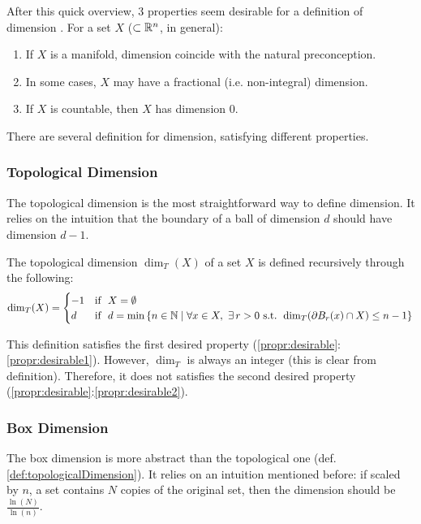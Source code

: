After this quick overview, 3 properties seem desirable for a definition of dimension \cite{Pollicott_LFDT}.
For a set $X$ ($\subset \mathbb{R}^n$, in general):
\begin{enumerate}\label{propr:desirable}
	\item If $X$ is a manifold, dimension coincide with the natural preconception. \label{propr:desirable1}
	\item In some cases, $X$ may have a fractional (i.e. non-integral) dimension. \label{propr:desirable2}
	\item If $X$ is countable, then $X$ has dimension $0$. \label{propr:desirable3}
\end{enumerate}
There are several definition for dimension, satisfying different properties.

\subsubsection{Topological Dimension}
The topological dimension is the most straightforward way to define dimension.
It relies on the intuition that the boundary of a ball of dimension $d$ should have dimension $d-1$.

\begin{definition}\label{def:topologicalDimension}
	The topological dimension $\dim_T(X)$ of a set $X$ is defined recursively through the following:
	\begin{equation*}
		\dim_T(X) =
		\begin{cases}
			-1 & \text{if } \ X = \emptyset \\
			 d & \text{if } \ d = \min \left\lbrace n \in \mathbb{N} \mid \forall x \in X, \ \exists \, r>0 \text{ s.t. } \dim_T(\partial B_r(x) \cap X) \leq n-1 \right\rbrace
		\end{cases}
	\end{equation*}
\end{definition}

This definition satisfies the first desired property (\ref{propr:desirable}:\ref{propr:desirable1}).
However, $\dim_T$ is always an integer (this is clear from definition).
Therefore, it does not satisfies the second desired property (\ref{propr:desirable}:\ref{propr:desirable2}).

\subsubsection{Box Dimension}
The box dimension is more abstract than the topological one (def. \ref{def:topologicalDimension}).
It relies on an intuition mentioned before: if scaled by $n$, a set contains $N$ copies of the original set, then the dimension should be  $\frac{\ln(N)}{\ln(n)}$.

